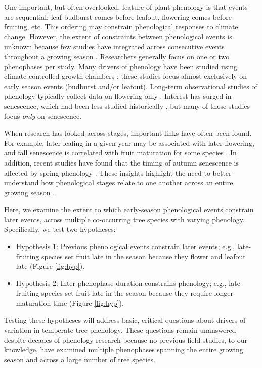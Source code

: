 \documentclass{article}
\begin{document}
\par One important, but often overlooked, feature of plant phenology is that events are sequential: leaf budburst comes before leafout, flowering comes before fruiting, etc. This ordering may constrain phenological responses to climate change. However, the extent of constraints between phenological events is unknown because few studies have integrated across consecutive events throughout a growing season \citep{wolkovich2014}. Researchers generally focus on one or two phenophases per study. Many drivers of phenology have been studied using climate-controlled growth chambers \citep[e.g.,][]{basler2012, laube2014}; these studies focus almost exclusively on early season events (budburst and/or leafout).  Long-term observational studies of phenology typically collect data on flowering only  \citep [e.g. 64\% of studies in ][]{wolkovich2012nectar}. Interest has surged in senescence, which had been less studied historically \citep {parmesan2006}, but many of these studies focus \textit{only} on senescence\citep [e.g.][]{taylor2008,archetti2013,jeong2014}.

\par When research has looked across stages, important links have often been found. For example, later  leafing in 
a given year may be associated with later flowering, and fall senescence is correlated with fruit maturation for some species \citep{lechowicz1995}. In addition, recent studies have found that the timing of autumn senescence is affected by spring phenology \citep {keenan2015,liu2016}. These insights highlight the need to better understand how phenological stages relate to one another across an entire growing season \citep{wolkovich2014}.

\par Here, we examine the extent to which early-season phenological events constrain later events, across multiple co-occurring tree species with varying phenology. Specifically, we test two hypotheses:
\begin{itemize}
\item Hypothesis 1: Previous phenological events constrain later events; e.g., late-fruiting species set fruit late in the season because they flower and leafout late  (Figure \ref{fig:hyp}).
\item Hypothesis 2: Inter-phenophase duration constrains phenology; e.g., late-fruiting species set fruit late in the season because they require longer maturation time (Figure \ref{fig:hyp}).
\end{itemize}
Testing these hypotheses will address basic, critical questions about drivers of variation in temperate tree phenology. These questions remain unanswered despite decades of phenology research because no previous field studies, to our knowledge, have examined multiple phenophases spanning the entire growing season and across a large number of tree species. 
\end{document}
